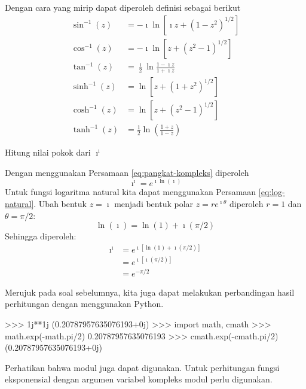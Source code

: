 Dengan cara yang mirip dapat diperoleh definisi sebagai berikut
\begin{align}
\sin^{-1}(z) & = -\imath \ln\left[\imath z+\left(1-z^{2}\right)^{1/2}\right] \label{eq:inv-sin-z}\\
\cos^{-1}(z) & = -\imath \ln\left[z+\left(z^{2}-1\right)^{1/2}\right] \\
\tan^{-1}(z) & = \frac{\imath }{2}\ln\frac{1-\imath z}{1+\imath z} \\
\sinh^{-1}(z) & = \ln\left[z + \left(1+z^{2} \right)^{1/2}\right] \\
\cosh^{-1}(z) & = \ln\left[z + \left(z^{2} - 1\right)^{1/2}\right] \\
\tanh^{-1}(z) & = \frac{1}{2} \ln\left( \frac{1+z}{1-z} \right)
\end{align}


\begin{contoh}
Hitung nilai pokok dari $\imath^{\imath}$

Dengan menggunakan Persamaan \eqref{eq:pangkat-kompleks} diperoleh
\begin{equation*}
\imath^{\imath} = e^{\imath \ln(\imath)}
\end{equation*}
Untuk fungsi logaritma natural kita dapat menggunakan Persamaan \ref{eq:log-natural}.
Ubah bentuk $z=\imath$ menjadi bentuk polar $z = r e^{\imath \theta}$ diperoleh
$r = 1$ dan $\theta = \pi/2$:
\begin{equation*}
\ln(\imath) = \ln(1) + \imath (\pi/2)
\end{equation*}
Sehingga diperoleh:
\begin{align*}
\imath^{\imath} & = e^{\imath\left[ \ln(1) + \imath (\pi/2) \right]} \\
& = e^{\imath\left[ \imath (\pi/2) \right]} \\
& = e^{-\pi/2}
\end{align*}

\end{contoh}

Merujuk pada soal sebelumnya, kita juga dapat melakukan
perbandingan hasil perhitungan dengan menggunakan Python.
\begin{pyconcode}
>>> 1j**1j
(0.20787957635076193+0j)
>>> import math, cmath
>>> math.exp(-math.pi/2)
0.20787957635076193
>>> cmath.exp(-cmath.pi/2)
(0.20787957635076193+0j)
\end{pyconcode}
Perhatikan bahwa modul  juga dapat digunakan. Untuk perhitungan
fungsi eksponensial dengan argumen variabel kompleks modul 
perlu digunakan.


